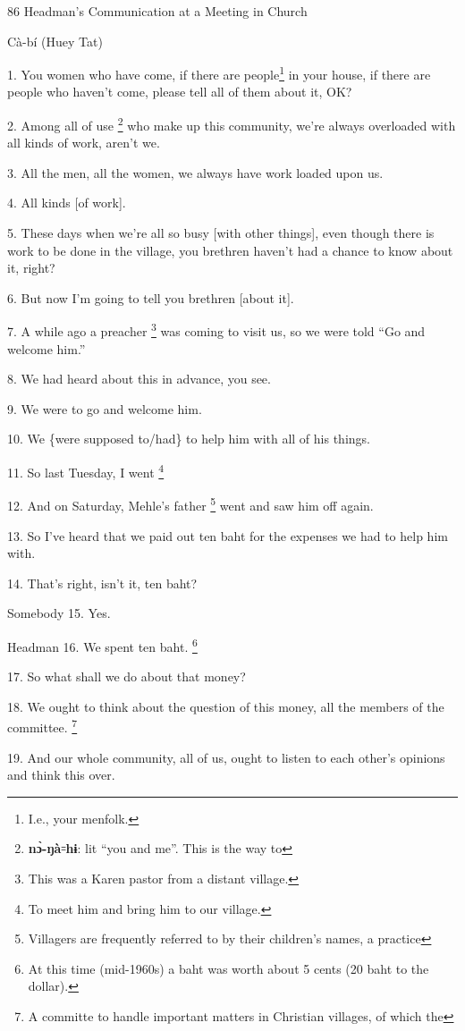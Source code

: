 
86 Headman's Communication at a Meeting in Church

Cà-bí (Huey Tat)

1. You women who have come, if there are people\footnote{I.e., your menfolk.} in your house, if there are
people who haven't come, please tell all of them about it, OK?

2. Among all of use \footnote{\textbf{nɔ̀-ŋà}꞊\textbf{hɨ}: lit ``you and me''. This is the way to} who make up this community, we're always overloaded with
all kinds of work, aren't we.

3. All the men, all the women, we always have work loaded upon us.

4. All kinds [of work].

5. These days when we're all so busy [with other things], even though there is
work to be done in the village, you brethren haven't had a chance to know about
it, right?

6. But now I'm going to tell you brethren [about it].

7. A while ago a preacher \footnote{This was a Karen pastor from a distant village.} was coming to visit us, so we were told ``Go and
welcome him.''

8. We had heard about this in advance, you see.

9. We were to go and welcome him.

10. We \{were supposed to/had\} to help him with all of his things.

11. So last Tuesday, I went \.\footnote{To meet him and bring him to our village.}

12. And on Saturday, Mehle's father \footnote{Villagers are frequently referred to by their children's names, a practice} went and saw him off again.

13. So I've heard that we paid out ten baht for the expenses we had to help him
with.

14. That's right, isn't it, ten baht?

Somebody 15. Yes.

Headman 16. We spent ten baht. \footnote{At this time (mid-1960s) a baht was worth about 5 cents (20 baht to the dollar).}

17. So what shall we do about that money?

18. We ought to think about the question of this money, all the members of the
committee. \footnote{A committe to handle important matters in Christian villages, of which the}

19. And our whole community, all of us, ought to listen to each other's opinions
and think this over.

